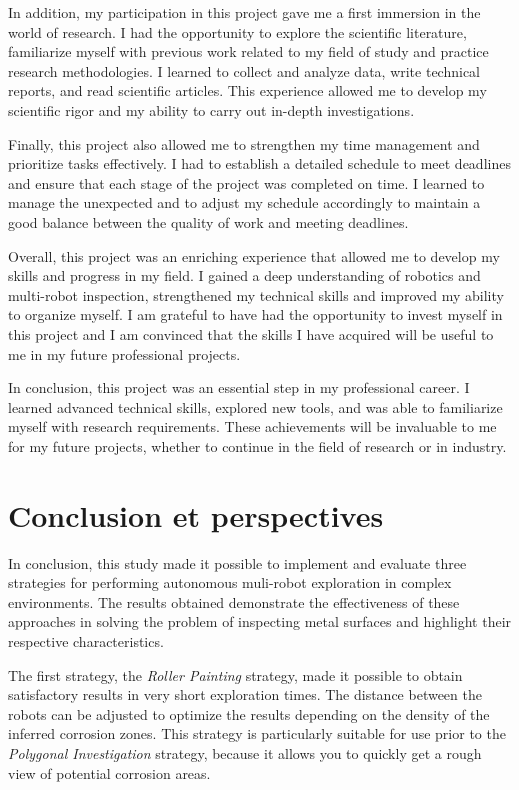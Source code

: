 \documentclass[english,RandD]{rapportPFE}  %
\begin{document}
		In addition, my participation in this project gave me a first immersion in the world of research.
		I had the opportunity to explore the scientific literature, familiarize myself with previous work related to my field of study and practice research methodologies.
		I learned to collect and analyze data, write technical reports, and read scientific articles.
		This experience allowed me to develop my scientific rigor and my ability to carry out in-depth investigations.

		Finally, this project also allowed me to strengthen my time management and prioritize tasks effectively.
		I had to establish a detailed schedule to meet deadlines and ensure that each stage of the project was completed on time.
		I learned to manage the unexpected and to adjust my schedule accordingly to maintain a good balance between the quality of work and meeting deadlines.

		Overall, this project was an enriching experience that allowed me to develop my skills and progress in my field.
		I gained a deep understanding of robotics and multi-robot inspection, strengthened my technical skills and improved my ability to organize myself.
		I am grateful to have had the opportunity to invest myself in this project and I am convinced that the skills I have acquired will be useful to me in my future professional projects.

		In conclusion, this project was an essential step in my professional career.
		I learned advanced technical skills, explored new tools, and was able to familiarize myself with research requirements.
		These achievements will be invaluable to me for my future projects, whether to continue in the field of research or in industry.
	\section{Conclusion et perspectives}
		In conclusion, this study made it possible to implement and evaluate three strategies for performing autonomous muli-robot exploration in complex environments.
		The results obtained demonstrate the effectiveness of these approaches in solving the problem of inspecting metal surfaces and highlight their respective characteristics.

		The first strategy, the \textit{Roller Painting} strategy, made it possible to obtain satisfactory results in very short exploration times.
		The distance between the robots can be adjusted to optimize the results depending on the density of the inferred corrosion zones.
		This strategy is particularly suitable for use prior to the \textit{Polygonal Investigation} strategy, because it allows you to quickly get a rough view of potential corrosion areas.
\end{document}
